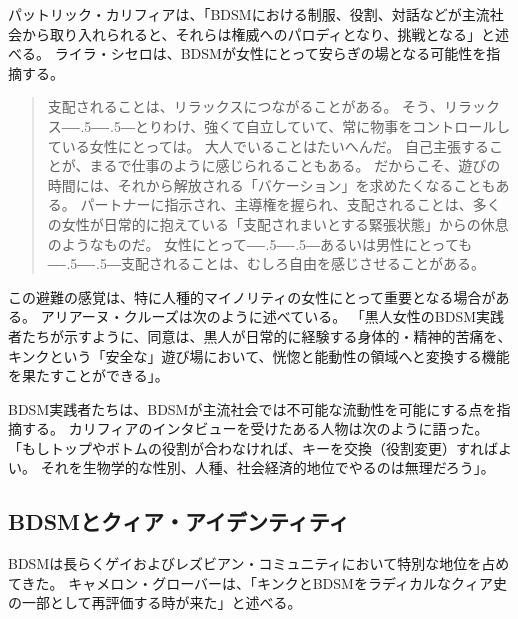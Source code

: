 \documentclass[paper=a4,book,openany]{jlreq}
\def\DDASH{―\kern-.5\zw―\kern-.5\zw―} %
\begin{document}
パットリック・カリフィアは、「BDSMにおける制服、役割、対話などが主流社会から取り入れられると、それらは権威へのパロディとなり、挑戦となる」と述べる\citep{califia79:_unrav_sexual_fring}。
ライラ・シセロは、BDSMが女性にとって安らぎの場となる可能性を指摘する。

\begin{quote}
  支配されることは、リラックスにつながることがある。
そう、リラックス{\DDASH}とりわけ、強くて自立していて、常に物事をコントロールしている女性にとっては。
大人でいることはたいへんだ。
自己主張することが、まるで仕事のように感じられることもある。
だからこそ、遊びの時間には、それから解放される「バケーション」を求めたくなることもある。
パートナーに指示され、主導権を握られ、支配されることは、多くの女性が日常的に抱えている「支配されまいとする緊張状態」からの休息のようなものだ。
女性にとって{\DDASH}あるいは男性にとっても{\DDASH}支配されることは、むしろ自由を感じさせることがある。
\citep{cicero12:_six_myths_kink_bdsm}
\end{quote}

この避難の感覚は、特に人種的マイノリティの女性にとって重要となる場合がある。
アリアーヌ・クルーズは次のように述べている。
「黒人女性のBDSM実践者たちが示すように、同意は、黒人が日常的に経験する身体的・精神的苦痛を、キンクという「安全な」遊び場において、恍惚と能動性の領域へと変換する機能を果たすことができる」\citep{wachter-grene16:_conver_arian_cruz}。

BDSM実践者たちは、BDSMが主流社会では不可能な流動性を可能にする点を指摘する。
カリフィアのインタビューを受けたある人物は次のように語った。
「もしトップやボトムの役割が合わなければ、キーを交換（役割変更）すればよい。
それを生物学的な性別、人種、社会経済的地位でやるのは無理だろう」\citep[pp.173-174]{califia00:_public_sex}。

\subsection{BDSMとクィア・アイデンティティ}

BDSMは長らくゲイおよびレズビアン・コミュニティにおいて特別な地位を占めてきた。
キャメロン・グローバーは、「キンクとBDSMをラディカルなクィア史の一部として再評価する時が来た」と述べる\citep{glover18:_its_time_recen_kink_bdsm}。
\end{document}
